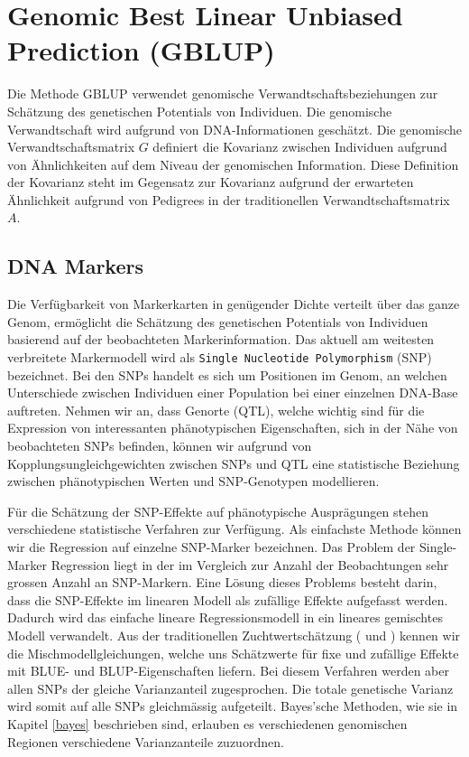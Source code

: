 \documentclass[]{book}
\begin{document}
\chapter{Genomic Best Linear Unbiased Prediction (GBLUP)}\label{gblup}

Die Methode GBLUP verwendet genomische Verwandtschaftsbeziehungen zur
Schätzung des genetischen Potentials von Individuen. Die genomische
Verwandtschaft wird aufgrund von DNA-Informationen geschätzt. Die
genomische Verwandtschaftsmatrix \(G\) definiert die Kovarianz zwischen
Individuen aufgrund von Ähnlichkeiten auf dem Niveau der genomischen
Information. Diese Definition der Kovarianz steht im Gegensatz zur
Kovarianz aufgrund der erwarteten Ähnlichkeit aufgrund von Pedigrees in
der traditionellen Verwandtschaftsmatrix \(A\).

\section{DNA Markers}\label{dna-markers}

Die Verfügbarkeit von Markerkarten in genügender Dichte verteilt über
das ganze Genom, ermöglicht die Schätzung des genetischen Potentials von
Individuen basierend auf der beobachteten Markerinformation. Das aktuell
am weitesten verbreitete Markermodell wird als
\texttt{Single\ Nucleotide\ Polymorphism} (SNP) bezeichnet. Bei den SNPs
handelt es sich um Positionen im Genom, an welchen Unterschiede zwischen
Individuen einer Population bei einer einzelnen DNA-Base auftreten.
Nehmen wir an, dass Genorte (QTL), welche wichtig sind für die
Expression von interessanten phänotypischen Eigenschaften, sich in der
Nähe von beobachteten SNPs befinden, können wir aufgrund von
Kopplungsungleichgewichten zwischen SNPs und QTL eine statistische
Beziehung zwischen phänotypischen Werten und SNP-Genotypen modellieren.

Für die Schätzung der SNP-Effekte auf phänotypische Ausprägungen stehen
verschiedene statistische Verfahren zur Verfügung. Als einfachste
Methode können wir die Regression auf einzelne SNP-Marker bezeichnen.
Das Problem der Single-Marker Regression liegt in der im Vergleich zur
Anzahl der Beobachtungen sehr grossen Anzahl an SNP-Markern. Eine Lösung
dieses Problems besteht darin, dass die SNP-Effekte im linearen Modell
als zufällige Effekte aufgefasst werden. Dadurch wird das einfache
lineare Regressionsmodell in ein lineares gemischtes Modell verwandelt.
Aus der traditionellen Zuchtwertschätzung (\citep{Hofer1990} und
\citep{vonRohr2016}) kennen wir die Mischmodellgleichungen, welche uns
Schätzwerte für fixe und zufällige Effekte mit BLUE- und
BLUP-Eigenschaften liefern. Bei diesem Verfahren werden aber allen SNPs
der gleiche Varianzanteil zugesprochen. Die totale genetische Varianz
wird somit auf alle SNPs gleichmässig aufgeteilt. Bayes'sche Methoden,
wie sie in Kapitel \ref{bayes} beschrieben sind, erlauben es
verschiedenen genomischen Regionen verschiedene Varianzanteile
zuzuordnen.
\end{document}
